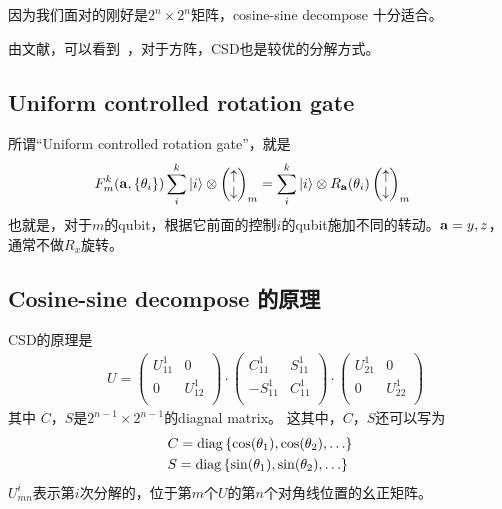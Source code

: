 因为我们面对的刚好是$2^n \times 2^n$矩阵，cosine-sine decompose 十分适合。

由文献，可以看到~\cite{compareIsometries}，对于方阵，CSD也是较优的分解方式。

\subsection{\label{sec:ucrgate}Uniform controlled rotation gate}

所谓``Uniform controlled rotation gate''，就是
\begin{equation}
\begin{split}
&F_m^k({\bf a},\{\theta _i\}) \sum _{i}^k|i\rangle \otimes \begin{pmatrix} \uparrow \\ \downarrow \end{pmatrix}_m =\sum _{i}^k |i\rangle \otimes R_{\bf a}(\theta _i)\begin{pmatrix} \uparrow \\ \downarrow \end{pmatrix}_m
\end{split}
\end{equation}
也就是，对于$m$的qubit，根据它前面的控制$i$的qubit施加不同的转动。${\bf a}=y,z$，通常不做$R_x$旋转。

\subsection{\label{sec:CSD}Cosine-sine decompose 的原理}

CSD的原理是
\begin{equation}
\begin{split}
&U=\begin{pmatrix}U^1_{11} & 0 \\ 0 & U^1_{12} \\ \end{pmatrix}\cdot\begin{pmatrix}C^1_{11} & S^1_{11} \\ -S^1_{11} & C^1_{11} \\ \end{pmatrix}\cdot\begin{pmatrix}U^1_{21} & 0 \\ 0 & U^1_{22} \\ \end{pmatrix}
\end{split}
\end{equation}
其中
$C$，$S$是$2^{n-1}\times 2^{n-1}$的diagnal matrix。
这其中，$C$，$S$还可以写为
\begin{equation}
\begin{split}
&C={\rm diag}\left\{\cos (\theta _1), \cos (\theta _2),\ldots \right\}\\
&S={\rm diag}\left\{\sin (\theta _1), \sin (\theta _2),\ldots \right\}\\
\end{split}
\end{equation}
$U^i_{mn}$表示第$i$次分解的，位于第$m$个$U$的第$n$个对角线位置的幺正矩阵。


